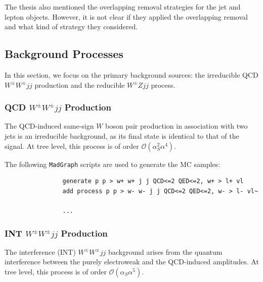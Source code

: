 \documentclass[12pt]{article}
\begin{document}
        The thesis also mentioned the overlapping removal strategies for the jet and lepton objects. However, it is not clear if they applied the overlapping removal and what kind of strategy they considered.


    \subsection{Background Processes}%
\label{sub:background_processes}

    In this section, we focus on the primary background sources: the irreducible QCD $W^\pm W^\pm jj$ production and the reducible $W^{\pm}Zjj$ process.

        \subsubsection{QCD \texorpdfstring{$W^{\pm}W^{\pm}jj$}{WWjj} Production}%
        \label{subs:qcd_wwjj_production}

            The QCD-induced same-sign $W$ boson pair production in association with two jets is an irreducible background, as its final state is identical to that of the signal. At tree level, this process is of order $\mathcal{O}(\alpha_S^2 \alpha^4)$.

            The following \verb|MadGraph| scripts are used to generate the MC samples:
            \begin{lstlisting}
                generate p p > w+ w+ j j QCD<=2 QED<=2, w+ > l+ vl
                add process p p > w- w- j j QCD<=2 QED<=2, w- > l- vl~

                ...
            \end{lstlisting}


        \subsubsection{INT \texorpdfstring{$W^{\pm}W^{\pm}jj$}{WWjj} Production}%
        \label{subs:int_wwjj_production}

            The interference (INT) $W^{\pm}W^{\pm}jj$ background arises from the quantum interference between the purely electroweak and the QCD-induced amplitudes. At tree level, this process is of order $\mathcal{O}(\alpha_S \alpha^5)$.
\end{document}
